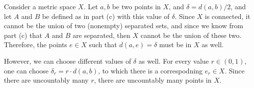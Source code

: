 \documentclass[10pt]{article}
\begin{document}
\begin{problem}
\begin{enumerate}[label=\alph*)]
				\begin{solution}
					Consider a metric space \( X \). Let \( a, b \) be two points in \( X \), and \( \delta = 
					d(a, b) / 2\), and let \( A \) and \( B \) be defined as in part (c) with this value 
					of \( \delta \). Since \( X \) is connected, it cannot be the union of two (nonempty) 
					separated sets, and since we know from part (c) that \( A \) and \( B \) are separated, 
					then \( X \) cannot be the union of these two. Therefore, the points 
					\( e \in X \) such that \( d(a, e) = \delta \) must be in \( X \) as well.

					However, we can choose different values of \( \delta \) as well. For every 
					value \( r \in (0, 1) \), one can choose \( \delta_r = r \cdot d(a, b) \), 
					to which there is a correspodning \( e_r \in X \). Since there are uncountably many 
					\( r \), there are uncountably many points in \( X \). 
				\end{solution}
		\end{enumerate}
	\end{problem}
\end{document}
